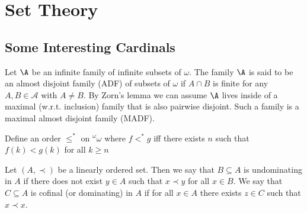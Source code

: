\documentclass{article}
\begin{document}
\section{Set Theory}

\subsection{Some Interesting Cardinals}

\begin{defn}
    Let \(\A\) be an infinite family of infinite subsets of \(\omega\). The family \(\A\) is said to be an almost disjoint family (ADF) of subsets of \(\omega\) if \(A \cap B \) is finite for any \(A,B \in \mathcal{A}\) with \(A \ne B\). By Zorn's lemma we can assume \(\A\) lives inside of a maximal (w.r.t. inclusion) family that is also pairwise disjoint. Such a family is a maximal almost disjoint family (MADF).
\end{defn}
\begin{defn}
    Define an order \(\leq^{\ast}\) on \(^\omega\omega\) where \(f <^{\ast} g\) iff there exists \(n\) such that \(f(k) < g(k)\) for all \(k \geq n\)
\end{defn}
\begin{defn}
    Let \((A, \prec)\) be a linearly ordered set. Then we say that \(B \subseteq A\) is undominating in \(A\) if there does not exist \(y \in A\) such that \(x \prec y\) for all \(x \in B\). We say that \(C \subseteq A\) is cofinal (or dominating) in \(A\) if for all \(x \in A\) there exists \(z \in C\) such that \(x \prec x\).
\end{defn}
\end{document}
